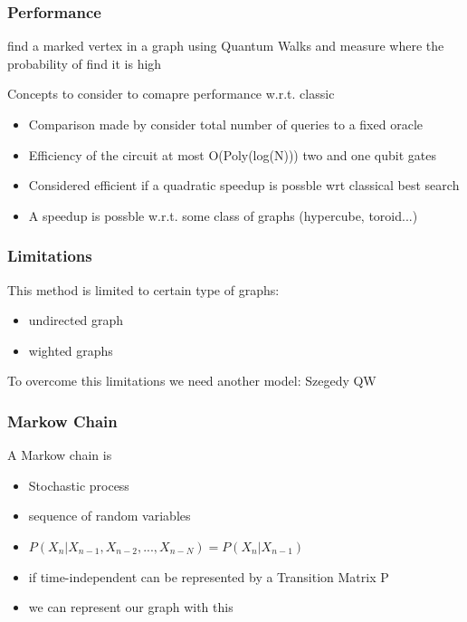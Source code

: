 \documentclass{beamer}
\begin{document}
\begin{frame}
    \frametitle{Performance}
    \begin{definition}
        find a marked vertex in a graph using Quantum Walks
        and measure where the probability of find it is high
    \end{definition}
    Concepts to consider to comapre performance w.r.t. classic
    \begin{itemize}
        \item \small Comparison made by consider total number of queries to a fixed oracle
        \item \small Efficiency of the circuit at most O(Poly(log(N))) two and one qubit gates
        \item \small Considered efficient if a quadratic speedup is possble wrt classical best search
        \item \small A speedup is possble w.r.t. some class of graphs (hypercube, toroid...)
    \end{itemize}

\end{frame}

\begin{frame}
    \frametitle{Limitations}
    This method is limited to certain type of graphs:
    \begin{itemize}
        \item undirected graph
        \item wighted graphs
    \end{itemize}
    To overcome this limitations we need another model: Szegedy QW
\end{frame}


\begin{frame}
    \frametitle{Markow Chain}
    A Markow chain is
    \begin{itemize}
        \item Stochastic process
        \item sequence of random variables
        \item $P(X_{n} | X_{n-1}, X_{n-2},...,X_{n-N}) = P(X_{n} | X_{n-1})$
        \item if time-independent can be represented by a Transition Matrix P
        \item we can represent our graph with this 
    \end{itemize} 

\end{frame}
\end{document}

